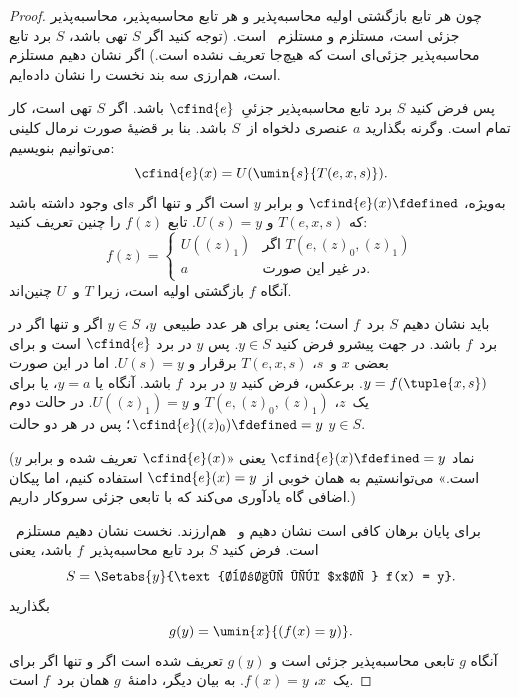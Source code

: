 \documentclass[../../../include/open-logic-section]{subfiles}
\begin{document}
\begin{proof}
چون هر تابع بازگشتی اولیه محاسبه‌پذیر و هر تابع محاسبه‌پذیر،
محاسبه‌پذیر جزئی است،  مستلزم
 و  مستلزم~ است.
(توجه کنید اگر $S$ تهی باشد، $S$ برد تابع محاسبه‌پذیر جزئی‌ای است که
هیچ‌جا تعریف نشده است.) اگر نشان دهیم  مستلزم
 است، هم‌ارزی سه بند نخست را نشان داده‌ایم.

پس فرض کنید $S$ برد تابع محاسبه‌پذیر جزئیِ~$\cfind{e}$ باشد. اگر $S$
تهی است، کار تمام است. وگرنه بگذارید $a$ عنصری دلخواه از~$S$ باشد.
بنا بر قضیهٔ صورت نرمال کلینی می‌توانیم بنویسیم:
\[
\cfind{e}(x) = U(\umin{s}{T(e, x, s)}).
\]
به‌ویژه، $\cfind{e}(x)\fdefined$ و برابر $y$ است اگر و تنها اگر
$s$ای وجود داشته باشد که $T(e,x,s)$ و $U(s)=y$. تابع $f(z)$ را چنین
تعریف کنید:
\[
f(z) = \begin{cases}
  U((z)_1) & \text{اگر $T(e, (z)_0, (z)_1)$} \\
  a        & \text{در غیر این صورت.}
\end{cases}
\]
آنگاه $f$ بازگشتی اولیه است، زیرا $T$ و~$U$ چنین‌اند.

باید نشان دهیم $S$ برد~$f$ است؛ یعنی برای هر عدد طبیعی~$y$،
$y\in S$ اگر و تنها اگر در برد~$f$ باشد. در جهت پیشرو فرض کنید
$y\in S$. پس $y$ در برد $\cfind{e}$ است و برای بعضی $x$ و~$s$،
$T(e,x,s)$ برقرار و $U(s)=y$. اما در این صورت
$y=f(\tuple{x,s})$. برعکس، فرض کنید $y$ در برد~$f$ باشد. آنگاه یا
$y=a$، یا برای یک~$z$، $T(e,(z)_0,(z)_1)$ و $U((z)_1)=y$. در حالت
دوم $\cfind{e}((z)_0)\fdefined=y$؛ پس در هر دو حالت $y\in S$.

(نماد $\cfind{e}(x)\fdefined=y$ یعنی «$\cfind{e}(x)$ تعریف شده و
برابر $y$ است.» می‌توانستیم به همان خوبی از
$\cfind{e}(x)=y$ استفاده کنیم، اما پیکان اضافی گاه یادآوری می‌کند که
با تابعی جزئی سروکار داریم.)

برای پایان برهان  کافی است نشان دهیم
 و~ هم‌ارزند. نخست نشان دهیم
 مستلزم~ است. فرض کنید $S$ برد
تابع محاسبه‌پذیر~$f$ باشد، یعنی
\[
S = \Setabs{y}{\text{برای یک $x$، } f(x) = y}.
\]
بگذارید
\[
g(y) = \umin{x}{(f(x) = y)}.
\]
آنگاه $g$ تابعی محاسبه‌پذیر جزئی است و $g(y)$ تعریف شده است اگر و
تنها اگر برای یک~$x$، $f(x)=y$. به بیان دیگر، دامنهٔ~$g$ همان
برد~$f$ است. 


\end{proof}
\end{document}
